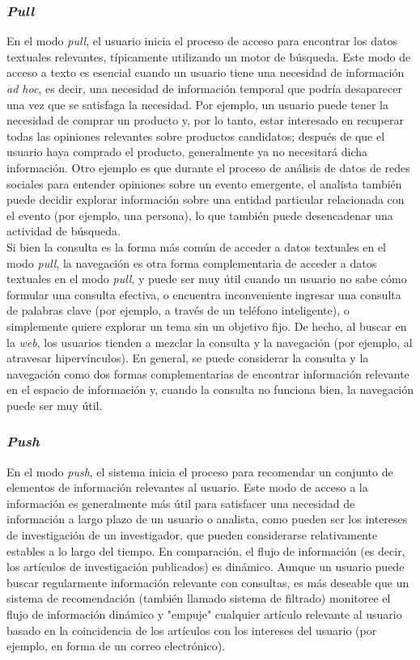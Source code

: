 \subsubsection{\textit{Pull}}

En el modo \textit{pull}, el usuario inicia el proceso de acceso para encontrar los datos textuales relevantes, típicamente utilizando un motor de búsqueda. Este modo de acceso a texto es esencial cuando un usuario tiene una necesidad de información \textit{ad hoc}, es decir, una necesidad de información temporal que podría desaparecer una vez que se satisfaga la necesidad. Por ejemplo, un usuario puede tener la necesidad de comprar un producto y, por lo tanto, estar interesado en recuperar todas las opiniones relevantes sobre productos candidatos; después de que el usuario haya comprado el producto, generalmente ya no necesitará dicha información. Otro ejemplo es que durante el proceso de análisis de datos de redes sociales para entender opiniones sobre un evento emergente, el analista también puede decidir explorar información sobre una entidad particular relacionada con el evento (por ejemplo, una persona), lo que también puede desencadenar una actividad de búsqueda. \\

Si bien la consulta es la forma más común de acceder a datos textuales en el modo \textit{pull}, la navegación es otra forma complementaria de acceder a datos textuales en el modo \textit{pull}, y puede ser muy útil cuando un usuario no sabe cómo formular una consulta efectiva, o encuentra inconveniente ingresar una consulta de palabras clave (por ejemplo, a través de un teléfono inteligente), o simplemente quiere explorar un tema sin un objetivo fijo. De hecho, al buscar en la \textit{web}, los usuarios tienden a mezclar la consulta y la navegación (por ejemplo, al atravesar hipervínculos). En general, se puede considerar la consulta y la navegación como dos formas complementarias de encontrar información relevante en el espacio de información y, cuando la consulta no funciona bien, la navegación puede ser muy útil. 

\subsubsection{\textit{Push}}

En el modo \textit{push}, el sistema inicia el proceso para recomendar un conjunto de elementos de información relevantes al usuario. Este modo de acceso a la información es generalmente más útil para satisfacer una necesidad de información a largo plazo de un usuario o analista, como pueden ser los intereses de investigación de un investigador, que pueden considerarse relativamente estables a lo largo del tiempo. En comparación, el flujo de información (es decir, los artículos de investigación publicados) es dinámico. Aunque un usuario puede buscar regularmente información relevante con consultas, es más deseable que un sistema de recomendación (también llamado sistema de filtrado) monitoree el flujo de información dinámico y "empuje" cualquier artículo relevante al usuario basado en la coincidencia de los artículos con los intereses del usuario (por ejemplo, en forma de un correo electrónico). \\

